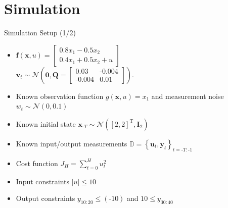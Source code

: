 \documentclass[student, noshadow, lsr, english, aspectratio=169]{ITR_LSR_slides}
\begin{document}
\section{Simulation}

\begin{frame}{Simulation Setup (1/2)}
\begin{itemize}
\item 
{}
$\boldsymbol{f}(\boldsymbol{x}, u) = 
\begin{bmatrix}
0.8  x_1 - 0.5 x_2 \\
0.4 x_1 + 0.5 x_2 + u
\end{bmatrix}$ \\
\makebox[4cm]{\hfill} $\boldsymbol{v}_t \sim \mathcal{N} \left(\boldsymbol{0}, \boldsymbol{Q} =  
\begin{bmatrix}
0.03 & \text{-}0.004 \\
\text{-}0.004 & 0.01
\end{bmatrix}
\right).$

\item Known observation function $g(\boldsymbol{x}, u) = x_1$ and measurement noise $w_t \sim \mathcal{N} (0, 0.1)$

\item Known initial state $\boldsymbol{x}_{\text{-}T} \sim \mathcal{N} ([2, 2]^\text{T}, \boldsymbol{I}_2)$ 

\item Known input/output measurements $\mathbb{D} = \left\{\boldsymbol{u}_{t}, \boldsymbol{y}_{t}\right\}_{t = \text{-}T:\text{-}1}$

\item Cost function $J_H = \sum_{t = 0}^H u_t^2$

\item Input constraints $\left| u \right| \leq 10$

\item Output constraints $y_{10:20} \leq (\text{-} 10)$ and $10 \leq y_{30:40}$
\end{itemize}
\end{frame}
\end{document}
